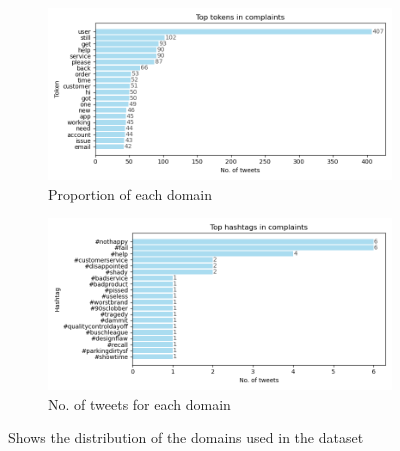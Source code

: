 \begin{figure}[htbp]
    \centering
    \captionsetup{font=small}
    \begin{subfigure}{1\textwidth}
        \centering
        \includegraphics[width=\linewidth]{figures/top_token_horiz_bar.png}
        \caption{Proportion of each domain}
        \label{fig: domain_dist_pct}
    \end{subfigure}
    \hfill
    \begin{subfigure}{1\textwidth}
        \centering
        \includegraphics[width=\linewidth]{figures/top_hash_horiz_bar.png}
        \caption{No. of tweets for each domain}
        \label{fig: domain_dist_count}
    \end{subfigure}
    \caption{Shows the distribution of the domains used in the dataset}
    \label{fig: compl_main_dist}
\end{figure}


